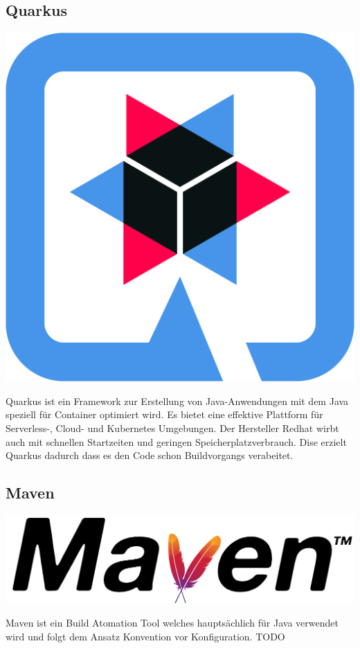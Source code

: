 \subsection{Quarkus}
\includegraphics[scale=0.015]{pics/quarkusLogo.png}

Quarkus ist ein Framework zur Erstellung von Java-Anwendungen mit dem Java speziell für Container optimiert wird. 
Es bietet eine effektive Plattform für Serverless-, Cloud- und Kubernetes Umgebungen. Der Hersteller Redhat wirbt 
auch mit schnellen Startzeiten und geringen Speicherplatzverbrauch. Dise erzielt Quarkus dadurch dass es den Code schon Buildvorgangs verabeitet.

\subsection{Maven}
\includegraphics[scale=0.015]{pics/apacheMavenLogo.svg.png}

Maven ist ein Build Atomation Tool welches hauptsächlich für Java verwendet wird und folgt dem Ansatz Konvention vor Konfiguration. TODO


